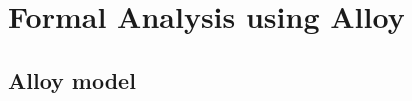 \documentclass[../rasd.tex]{subfiles}
\begin{document}
\chapter{Formal Analysis using Alloy}
\thispagestyle{fancy}
	\section{Alloy model}
	
\end{document}
